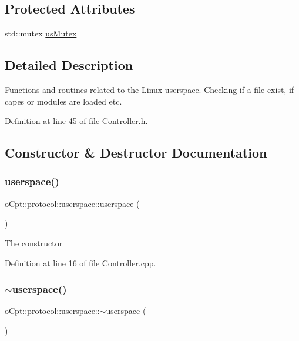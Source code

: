 \subsection*{Protected Attributes}
\begin{DoxyCompactItemize}
\item 
std\+::mutex \hyperlink{classo_cpt_1_1protocol_1_1userspace_a8b03459e89a6ea65ed3f9cd4c38430dd}{us\+Mutex}
\end{DoxyCompactItemize}


\subsection{Detailed Description}
Functions and routines related to the Linux userspace. Checking if a file exist, if capes or modules are loaded etc. 

Definition at line 45 of file Controller.\+h.



\subsection{Constructor \& Destructor Documentation}
\hypertarget{classo_cpt_1_1protocol_1_1userspace_a845ca02e8c8613813d643c64e6e917c3}{}\label{classo_cpt_1_1protocol_1_1userspace_a845ca02e8c8613813d643c64e6e917c3} 
\subsubsection{\texorpdfstring{userspace()}{userspace()}}
{\footnotesize\ttfamily o\+Cpt\+::protocol\+::userspace\+::userspace (\begin{DoxyParamCaption}{ }\end{DoxyParamCaption})}

The constructor 

Definition at line 16 of file Controller.\+cpp.

\hypertarget{classo_cpt_1_1protocol_1_1userspace_ae97e147b38f9a48ca9389960b7378d25}{}\label{classo_cpt_1_1protocol_1_1userspace_ae97e147b38f9a48ca9389960b7378d25} 
\subsubsection{\texorpdfstring{$\sim$userspace()}{~userspace()}}
{\footnotesize\ttfamily o\+Cpt\+::protocol\+::userspace\+::$\sim$userspace (\begin{DoxyParamCaption}{ }\end{DoxyParamCaption})\hspace{0.3cm}{\ttfamily [virtual]}}

